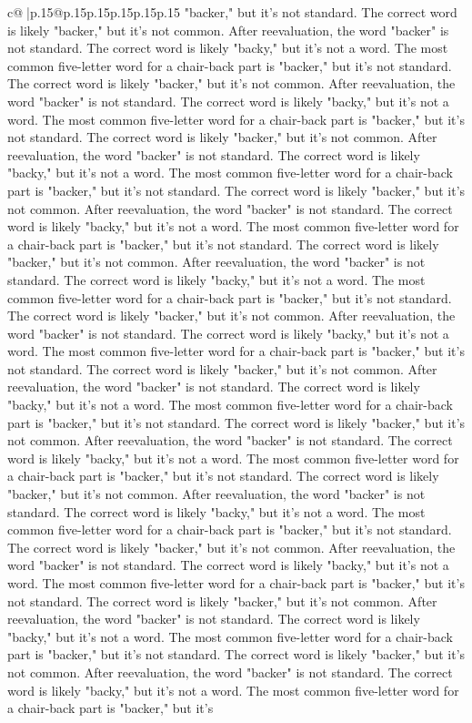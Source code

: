 \documentclass{article}
\begin{document}
{\begin{supertabular}{c@{$\;$}|p{.15\linewidth}@{}p{.15\linewidth}p{.15\linewidth}p{.15\linewidth}p{.15\linewidth}p{.15\linewidth}}
{{{"backer," but it's not standard. The correct word is likely "backer," but it's not common. After reevaluation, the word "backer" is not standard. The correct word is likely "backy," but it's not a word. The most common five{-}letter word for a chair{-}back part is "backer," but it's not standard. The correct word is likely "backer," but it's not common. After reevaluation, the word "backer" is not standard. The correct word is likely "backy," but it's not a word. The most common five{-}letter word for a chair{-}back part is "backer," but it's not standard. The correct word is likely "backer," but it's not common. After reevaluation, the word "backer" is not standard. The correct word is likely "backy," but it's not a word. The most common five{-}letter word for a chair{-}back part is "backer," but it's not standard. The correct word is likely "backer," but it's not common. After reevaluation, the word "backer" is not standard. The correct word is likely "backy," but it's not a word. The most common five{-}letter word for a chair{-}back part is "backer," but it's not standard. The correct word is likely "backer," but it's not common. After reevaluation, the word "backer" is not standard. The correct word is likely "backy," but it's not a word. The most common five{-}letter word for a chair{-}back part is "backer," but it's not standard. The correct word is likely "backer," but it's not common. After reevaluation, the word "backer" is not standard. The correct word is likely "backy," but it's not a word. The most common five{-}letter word for a chair{-}back part is "backer," but it's not standard. The correct word is likely "backer," but it's not common. After reevaluation, the word "backer" is not standard. The correct word is likely "backy," but it's not a word. The most common five{-}letter word for a chair{-}back part is "backer," but it's not standard. The correct word is likely "backer," but it's not common. After reevaluation, the word "backer" is not standard. The correct word is likely "backy," but it's not a word. The most common five{-}letter word for a chair{-}back part is "backer," but it's not standard. The correct word is likely "backer," but it's not common. After reevaluation, the word "backer" is not standard. The correct word is likely "backy," but it's not a word. The most common five{-}letter word for a chair{-}back part is "backer," but it's not standard. The correct word is likely "backer," but it's not common. After reevaluation, the word "backer" is not standard. The correct word is likely "backy," but it's not a word. The most common five{-}letter word for a chair{-}back part is "backer," but it's not standard. The correct word is likely "backer," but it's not common. After reevaluation, the word "backer" is not standard. The correct word is likely "backy," but it's not a word. The most common five{-}letter word for a chair{-}back part is "backer," but it's not standard. The correct word is likely "backer," but it's not common. After reevaluation, the word "backer" is not standard. The correct word is likely "backy," but it's not a word. The most common five{-}letter word for a chair{-}back part is "backer," but it's }}}
\end{supertabular}}
\end{document}
